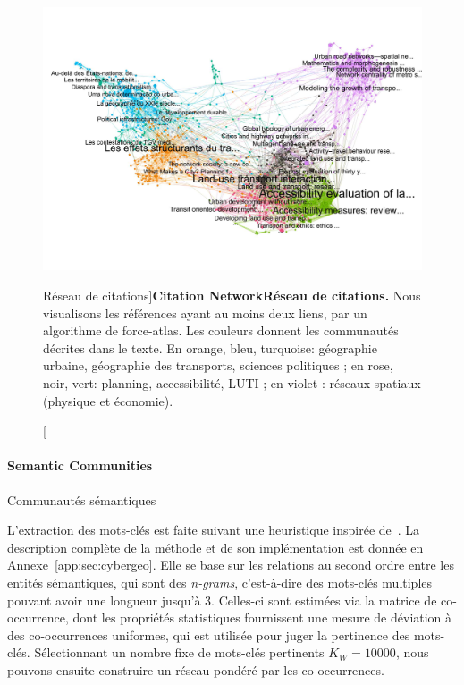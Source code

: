 \begin{figure}[!ht]
\includegraphics[width=\linewidth]{Figures/Final/2-2-2-fig-quantepistemo-citnw.jpg}
\caption[Citation Network][Réseau de citations]{\textbf{Citation Network}\label{fig:quantepistemo:citnw}}{\textbf{Réseau de citations.} Nous visualisons les références ayant au moins deux liens, par un algorithme de force-atlas. Les couleurs donnent les communautés décrites dans le texte. En orange, bleu, turquoise: géographie urbaine, géographie des transports, sciences politiques ; en rose, noir, vert: planning, accessibilité, LUTI ; en violet : réseaux spatiaux (physique et économie).\label{fig:quantepistemo:citnw}}
\end{figure}





\paragraph{Semantic Communities}{Communautés sémantiques}


L'extraction des mots-clés est faite suivant une heuristique inspirée de~\cite{chavalarias2013phylomemetic}. La description complète de la méthode et de son implémentation est donnée en Annexe~\ref{app:sec:cybergeo}. Elle se base sur les relations au second ordre entre les entités sémantiques, qui sont des \emph{n-grams}, c'est-à-dire des mots-clés multiples pouvant avoir une longueur jusqu'à 3. Celles-ci sont estimées via la matrice de co-occurrence, dont les propriétés statistiques fournissent une mesure de déviation à des co-occurrences uniformes, qui est utilisée pour juger la pertinence des mots-clés. Sélectionnant un nombre fixe de mots-clés pertinents $K_W = 10000$, nous pouvons ensuite construire un réseau pondéré par les co-occurrences.



